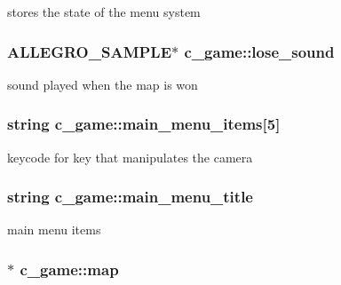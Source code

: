 stores the state of the menu system \hypertarget{classc__game_afcd2c8c94a4adf5ff06df97cbe7ddaea}{
\subsubsection[{lose\-\_\-sound}]{\setlength{\rightskip}{0pt plus 5cm}A\-L\-L\-E\-G\-R\-O\-\_\-\-S\-A\-M\-P\-L\-E$\ast$ c\-\_\-game\-::lose\-\_\-sound\hspace{0.3cm}{\ttfamily [protected]}}}\label{classc__game_afcd2c8c94a4adf5ff06df97cbe7ddaea}
sound played when the map is won \hypertarget{classc__game_a8cc35efdfce547a98732d6a3b56fcc92}{
\subsubsection[{main\-\_\-menu\-\_\-items}]{\setlength{\rightskip}{0pt plus 5cm}string c\-\_\-game\-::main\-\_\-menu\-\_\-items\mbox{[}5\mbox{]}\hspace{0.3cm}{\ttfamily [protected]}}}\label{classc__game_a8cc35efdfce547a98732d6a3b56fcc92}
keycode for key that manipulates the camera \hypertarget{classc__game_a5e32341c8fcd20ce470ff11765717e8d}{
\subsubsection[{main\-\_\-menu\-\_\-title}]{\setlength{\rightskip}{0pt plus 5cm}string c\-\_\-game\-::main\-\_\-menu\-\_\-title\hspace{0.3cm}{\ttfamily [protected]}}}\label{classc__game_a5e32341c8fcd20ce470ff11765717e8d}
main menu items \hypertarget{classc__game_a64da959df63b76ac18b0f25ad707db9f}{
\subsubsection[{map}]{$\ast$ c\-\_\-game\-::map\hspace{0.3cm}{\ttfamily [protected]}}}\label{classc__game_a64da959df63b76ac18b0f25ad707db9f}
